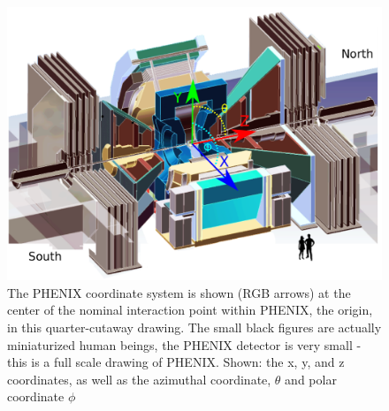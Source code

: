 \begin{figure}
  \centering
  \includegraphics[width=\linewidth]{./figures/phenix_coordinate_system.png}
  \caption{
    The PHENIX coordinate system is shown (RGB arrows) at the center of the
    nominal interaction point within PHENIX, the origin, in this quarter-cutaway
    drawing. The small black figures are actually miniaturized human beings, the
    PHENIX detector is very small - this is a full scale drawing of PHENIX.
    Shown: the x, y, and z coordinates, as well as the azimuthal coordinate,
    $\theta$ and polar coordinate $\phi$ ~\cite{WebPHENIXDrawings}
  }
  \label{fig:phenix_coordinate_system}

\end{figure}


